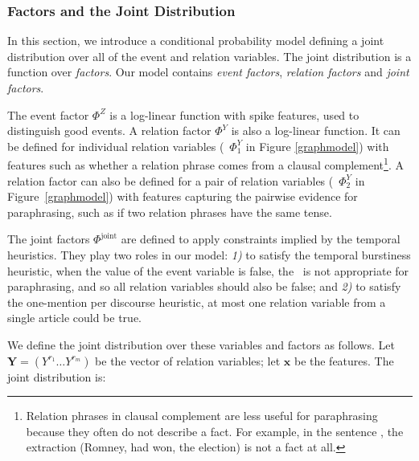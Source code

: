 
\subsubsection{Factors and the Joint Distribution}
\label{sec:factorsAndTheJointDistribution}
In this section, we introduce a conditional probability model defining
a joint distribution over all of the event and relation variables. The
joint distribution is a function over {\it factors}. Our model
contains {\em event factors}, {\em relation factors} and {\em joint factors}.

The event factor $\Phi^Z$ is a log-linear function with spike
features, used to distinguish good events. A relation factor
$\Phi^Y$ is also a log-linear function. It can be defined for
individual relation variables (\eg\ $\Phi^Y_1$ in Figure \ref{graphmodel})
with features such as whether a relation phrase comes from a clausal
complement\footnote{Relation phrases in clausal complement are less useful for
paraphrasing because they often do not describe a fact. For example, in the
sentence , the extraction (Romney, had
won, the election) is not a fact at all.}.
A relation factor can also be defined for a pair of relation variables (\eg\
$\Phi^Y_2$ in Figure~\ref{graphmodel}) with features capturing the pairwise
evidence for paraphrasing, such as if two relation phrases have the same tense.


The joint factors $\Phi^{\text{joint}}$ are defined to apply constraints
implied by the temporal heuristics. They play two roles in our model:
\textit{1)} to satisfy the temporal burstiness heuristic, when the value of
the event variable is false, the \eec\ is not appropriate for paraphrasing,
and so all relation variables should also be false; and \textit{2)} to
satisfy the one-mention per discourse heuristic, at most one relation
variable from a single article could be true.

We define the joint distribution over these variables and factors as
follows. Let $\mathbf{Y}=(Y^{r_1}\ldots Y^{r_m})$ be the vector of relation
variables; let $\mathbf{x}$ be the features. The joint distribution is:

